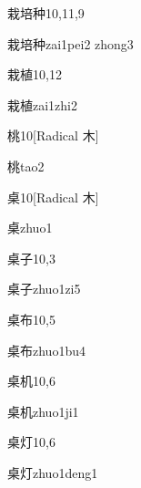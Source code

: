 \begin{entry}{栽培种}{10,11,9}
  \begin{phonetics}{栽培种}{zai1pei2 zhong3}
  \end{phonetics}
\end{entry}

\begin{entry}{栽植}{10,12}
  \begin{phonetics}{栽植}{zai1zhi2}
  \end{phonetics}
\end{entry}

\begin{entry}{桃}{10}[Radical 木]
  \begin{phonetics}{桃}{tao2}
  \end{phonetics}
\end{entry}

\begin{entry}{桌}{10}[Radical 木]
  \begin{phonetics}{桌}{zhuo1}
  \end{phonetics}
\end{entry}

\begin{entry}{桌子}{10,3}
  \begin{phonetics}{桌子}{zhuo1zi5}
  \end{phonetics}
\end{entry}

\begin{entry}{桌布}{10,5}
  \begin{phonetics}{桌布}{zhuo1bu4}
  \end{phonetics}
\end{entry}

\begin{entry}{桌机}{10,6}
  \begin{phonetics}{桌机}{zhuo1ji1}
  \end{phonetics}
\end{entry}

\begin{entry}{桌灯}{10,6}
  \begin{phonetics}{桌灯}{zhuo1deng1}
  \end{phonetics}
\end{entry}

